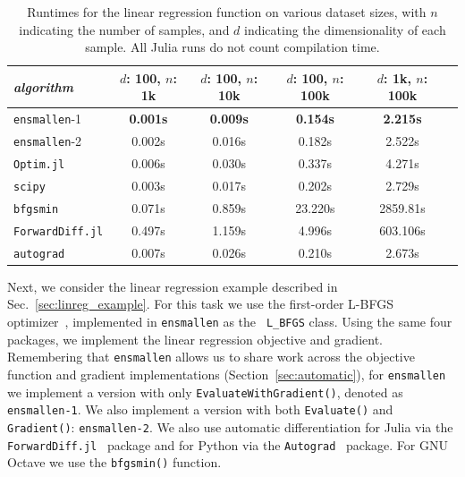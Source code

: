 \begin{table}[t!]
\centering
\begin{tabular}{lccccc}
\toprule
{\em algorithm} & $d$: 100, $n$: 1k & $d$: 100, $n$: 10k & $d$: 100, $n$:
100k & $d$: 1k, $n$: 100k \\
\midrule
\texttt{ensmallen}-1 & {\bf 0.001s} & {\bf 0.009s} & {\bf 0.154s} & {\bf 2.215s} \\
\texttt{ensmallen}-2 & 0.002s & 0.016s & 0.182s & 2.522s \\
\texttt{Optim.jl} & 0.006s & 0.030s & 0.337s & 4.271s \\
\texttt{scipy} & 0.003s & 0.017s & 0.202s & 2.729s \\
\texttt{bfgsmin} & 0.071s & 0.859s & 23.220s & 2859.81s\\
\texttt{ForwardDiff.jl} & 0.497s & 1.159s & 4.996s & 603.106s \\
\texttt{autograd} & 0.007s & 0.026s & 0.210s & 2.673s \\
\bottomrule
\end{tabular}
\vspace*{0.25ex}
\caption{
Runtimes for the linear regression function on various dataset sizes,
with $n$ indicating the number of samples,
and $d$ indicating the dimensionality of each sample.
All Julia runs do not count compilation time.}
\label{tab:lbfgs}
\end{table}

Next, we consider the linear regression example described in
Sec.~\ref{sec:linreg_example}.  For this task we use the first-order L-BFGS
optimizer~\cite{liu1989limited}, implemented in {\tt ensmallen} as the {\tt
L\_BFGS} class.  Using the same four packages, we implement
the linear regression objective and gradient.  Remembering that {\tt ensmallen}
allows us to share work across the objective function and gradient
implementations (Section~\ref{sec:automatic}), for {\tt ensmallen} we implement
a version with only {\tt EvaluateWithGradient()}, denoted as {\tt ensmallen-1}.
We also implement a version with both \texttt{Evaluate()} and
\texttt{Gradient()}: \texttt{ensmallen-2}.  We also use automatic
differentiation for Julia via the \texttt{
ForwardDiff.jl}~\cite{RevelsLubinPapamarkou2016} package and for Python via the
\texttt{Autograd}~\cite{maclaurin2015autograd} package.  For GNU Octave
we use the \texttt{bfgsmin()} function.

